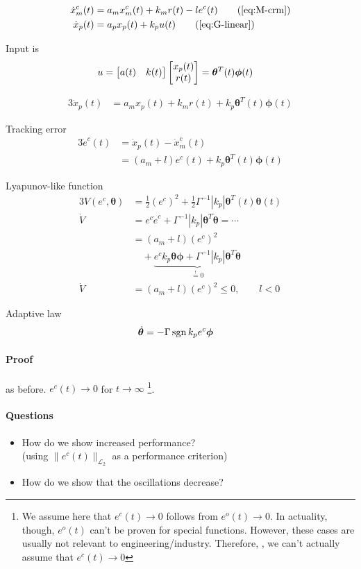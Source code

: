 \begin{alignat*}{3}
\dot{x}_m^c(t) &= a_m x_m^c(t) + k_m r(t) - le^c(t)
    \tag{\ref{eq:M-crm}}\\
\dot{x}_p(t) &= a_p x_p(t) + k_p u(t) 
    \tag{\ref{eq:G-linear}}
\end{alignat*}

Input is
\begin{alignat*}{3}
u &= \matr{a(t) & k(t)} \matr{x_p(t) \\ r(t)}%
    = \bm{\theta}^T(t) \bm{\phi}(t) 
\end{alignat*}

\begin{alignat*}{3}
\dot{x}_p(t) &= a_m x_p(t) + k_m r(t) + k_p \bm{\theta}^T(t) \bm{\phi}(t)
\end{alignat*}

Tracking error
\begin{alignat*}{3}
\dot{e}^c(t) &= \dot{x}_p(t) - \dot{x}_m^c(t)\\
    &= \left( a_m + l \right) e^c(t) + k_p \bm{\theta}^T(t) \bm{\phi}(t)
\end{alignat*}

Lyapunov-like function
\begin{alignat*}{3}
V(e^c, \bm{\theta})
    &= \frac{1}{2} (e^c)^2 + \frac{1}{2} \Gamma^{-1} |k_p| \bm{\theta}^T(t) \bm{\theta}(t)\\
\dot{V}
    &= e^c \dot{e}^c + \Gamma^{-1} |k_p| \bm{\theta}^T \bm{\dot{\theta}} = \cdots\\
    &= \left( a_m + l \right) (e^c)^2\\
    & \quad     + \underbrace{e^c k_p \bm{\theta} \bm{ \phi}
        + \Gamma^{-1} |k_p| \bm{\theta}^T \bm{\dot{\theta}}}_{ \overset{!}{=} 0}\\
\dot{V} &= \left( a_m + l \right) (e^c)^2 \leq 0, \qquad l < 0
\end{alignat*}

Adaptive law
\begin{alignat*}{3}
\dot{\bm{\theta}} &= -\Gamma \operatorname{sgn}{k_p} e^c \bm{\phi}
\end{alignat*}

\paragraph{Proof} as before.
$e^c(t) \rightarrow 0$ for $t \rightarrow \infty$ %
\footnote{We assume here that $e^c(t) \rightarrow 0$ follows from
$e^o(t) \rightarrow 0$. In actuality, though, $e^o(t)$ can't
be proven for special functions. However, these cases
are usually not relevant to engineering/industry.
Therefore, , we can't actually assume
that $e^c(t) \rightarrow 0$}.

\paragraph{Questions}
\begin{itemize}
\item How do we show increased performance?\\
    (using $\| e^c(t) \|_{ \mathcal{L}_2}$ as a performance criterion)
\item How do we show that the oscillations decrease?
\end{itemize}

